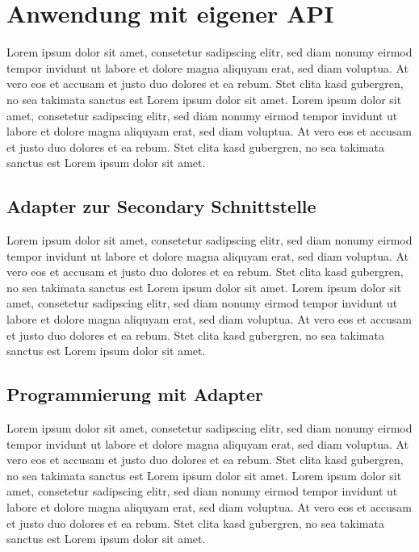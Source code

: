 \section{Anwendung mit eigener API}
\label{sec:script_hoerherer_schicht_rel}
Lorem ipsum dolor sit amet, consetetur sadipscing elitr, sed diam nonumy eirmod tempor invidunt ut labore et dolore magna aliquyam erat, sed diam voluptua. At vero eos et accusam et justo duo dolores et ea rebum. Stet clita kasd gubergren, no sea takimata sanctus est Lorem ipsum dolor sit amet. Lorem ipsum dolor sit amet, consetetur sadipscing elitr, sed diam nonumy eirmod tempor invidunt ut labore et dolore magna aliquyam erat, sed diam voluptua. At vero eos et accusam et justo duo dolores et ea rebum. Stet clita kasd gubergren, no sea takimata sanctus est Lorem ipsum dolor sit amet.

\subsection{Adapter zur Secondary Schnittstelle}
\label{beschreibung_script_hoeher_schicht}
Lorem ipsum dolor sit amet, consetetur sadipscing elitr, sed diam nonumy eirmod tempor invidunt ut labore et dolore magna aliquyam erat, sed diam voluptua. At vero eos et accusam et justo duo dolores et ea rebum. Stet clita kasd gubergren, no sea takimata sanctus est Lorem ipsum dolor sit amet. Lorem ipsum dolor sit amet, consetetur sadipscing elitr, sed diam nonumy eirmod tempor invidunt ut labore et dolore magna aliquyam erat, sed diam voluptua. At vero eos et accusam et justo duo dolores et ea rebum. Stet clita kasd gubergren, no sea takimata sanctus est Lorem ipsum dolor sit amet.

\subsection{Programmierung mit Adapter}
\label{programmierung_mit_hoerherer_schicht}
Lorem ipsum dolor sit amet, consetetur sadipscing elitr, sed diam nonumy eirmod tempor invidunt ut labore et dolore magna aliquyam erat, sed diam voluptua. At vero eos et accusam et justo duo dolores et ea rebum. Stet clita kasd gubergren, no sea takimata sanctus est Lorem ipsum dolor sit amet. Lorem ipsum dolor sit amet, consetetur sadipscing elitr, sed diam nonumy eirmod tempor invidunt ut labore et dolore magna aliquyam erat, sed diam voluptua. At vero eos et accusam et justo duo dolores et ea rebum. Stet clita kasd gubergren, no sea takimata sanctus est Lorem ipsum dolor sit amet.

